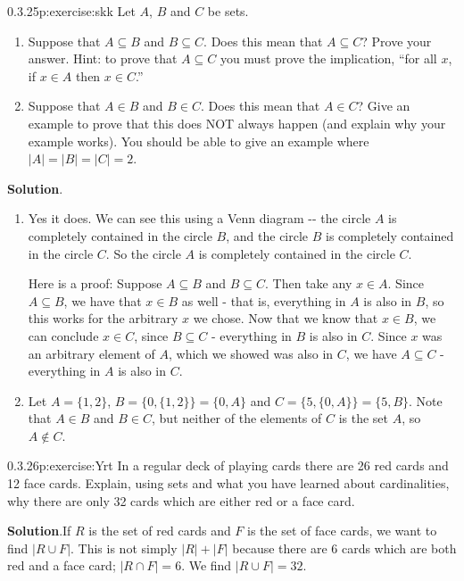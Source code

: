 \documentclass[twoside,11pt,]{book}
\newcommand{\blocktitlefont}{\relax}
\numberwithin{equation}{chapter}
\begin{document}
\begin{divisionsolution}{0.3.25}{}{p:exercise:skk}%
Let \(A\), \(B\) and \(C\) be sets.%
\begin{enumerate}[label=(\alph*)]
\item{}Suppose that \(A \subseteq B\) and \(B \subseteq C\). Does this mean that \(A \subseteq C\)? Prove your answer. Hint: to prove that \(A \subseteq C\) you must prove the implication, ``for all \(x\), if \(x \in A\) then \(x \in C\).''%
\item{}Suppose that \(A \in B\) and \(B \in C\). Does this mean that \(A \in C\)? Give an example to prove that this does NOT always happen (and explain why your example works). You should be able to give an example where \(|A| = |B| = |C| = 2\).%
\end{enumerate}
%
\par\smallskip%
\noindent\textbf{\blocktitlefont Solution}.\quad{}%
\begin{enumerate}[label=(\alph*)]
\item{}Yes it does. We can see this using a Venn diagram -{}-{} the circle \(A\) is completely contained in the circle \(B\), and the circle \(B\) is completely contained in the circle \(C\). So the circle \(A\) is completely contained in the circle \(C\).%
\par
Here is a proof: Suppose \(A \subseteq B\) and \(B \subseteq C\). Then take any \(x \in A\). Since \(A \subseteq B\), we have that \(x \in B\) as well - that is, everything in \(A\) is also in \(B\), so this works for the arbitrary \(x\) we chose. Now that we know that \(x \in B\), we can conclude \(x \in C\), since \(B \subseteq C\) - everything in \(B\) is also in \(C\). Since \(x\) was an arbitrary element of \(A\), which we showed was also in \(C\), we have \(A \subseteq C\) - everything in \(A\) is also in \(C\).%
\item{}Let \(A = \{1,2\}\), \(B = \{0, \{1,2\}\} = \{0, A\}\) and \(C = \{5, \{0, A\}\} = \{5, B\}\). Note that \(A \in B\) and \(B \in C\), but neither of the elements of \(C\) is the set \(A\), so \(A \notin C\).%
\end{enumerate}
%
\end{divisionsolution}%
\begin{divisionsolution}{0.3.26}{}{p:exercise:Yrt}%
In a regular deck of playing cards there are 26 red cards and 12 face cards. Explain, using sets and what you have learned about cardinalities, why there are only 32 cards which are either red or a face card.%
\par\smallskip%
\noindent\textbf{\blocktitlefont Solution}.\quad{}If \(R\) is the set of red cards and \(F\) is the set of face cards, we want to find \(|R \cup F|\). This is not simply \(|R| + |F|\) because there are 6 cards which are both red and a face card; \(|R \cap F| = 6\). We find \(|R \cup F| = 32\).%
\end{divisionsolution}%
\end{document}
